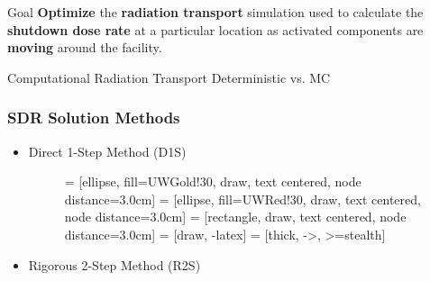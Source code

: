 \documentclass{beamer}
\begin{document}
\begin{frame}{Goal}
	\textbf{Optimize} the \textbf{radiation transport} 
	simulation used to
	calculate the \textbf{shutdown dose rate}
	at a particular location as activated components are
	\textbf{moving} around the facility.
\end{frame}

\begin{frame}{Computational Radiation Transport}
Deterministic vs. MC
\end{frame}

\begin{frame}
\frametitle{SDR Solution Methods}

\begin{minipage}{0.49\textwidth}
\begin{itemize}
\item{Direct 1-Step Method (D1S)}
	\vspace{1cm}
	\begin{figure}
        \centering

         = [ellipse, fill=UWGold!30, draw, text centered,
		node distance=3.0cm]
         = [ellipse, fill=UWRed!30, draw, text centered, node
		distance=3.0cm]
         = [rectangle, draw, text centered, node distance=3.0cm]
         = [draw, -latex]
         = [thick, ->, >=stealth]
        
        \end{figure}
\end{itemize}
\end{minipage}
\hfill
\begin{minipage}{0.49\textwidth}
\begin{itemize}
\item{Rigorous 2-Step Method (R2S)}
	\vspace{1cm}
	\begin{figure}
        \centering


\end{figure}
\end{itemize}
\end{minipage}
\end{frame}
\end{document}
